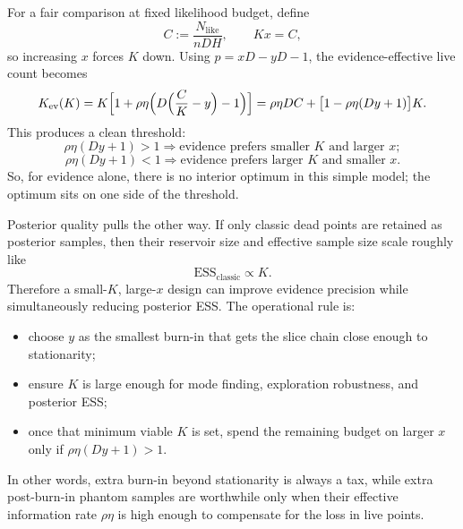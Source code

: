 \documentclass[10pt]{article}
\begin{document}
For a fair comparison at fixed likelihood budget, define
\[
C:=\frac{N_{\mathrm{like}}}{nDH},\qquad Kx=C,
\]
so increasing $x$ forces $K$ down. Using $p=xD-yD-1$, the evidence-effective live count becomes
\[
K_{\mathrm{ev}}(K)=K\Bigl[1+\rho\eta\Bigl(D\Bigl(\frac{C}{K}-y\Bigr)-1\Bigr)\Bigr]
= \rho\eta DC + \bigl[1-\rho\eta(Dy+1)\bigr]K.
\]
This produces a clean threshold:
\[
\boxed{\;\rho\eta(Dy+1)>1 \Longrightarrow \text{evidence prefers smaller $K$ and larger $x$};\;}
\]
\[
\boxed{\;\rho\eta(Dy+1)<1 \Longrightarrow \text{evidence prefers larger $K$ and smaller $x$}.\;}
\]
So, for evidence alone, there is no interior optimum in this simple model; the optimum sits on one side of the threshold.

Posterior quality pulls the other way. If only classic dead points are retained as posterior samples, then their reservoir size and effective sample size scale roughly like
\[
\mathrm{ESS}_{\mathrm{classic}} \propto K.
\]
Therefore a small-$K$, large-$x$ design can improve evidence precision while simultaneously reducing posterior ESS. The operational rule is:
\begin{itemize}
    \item choose $y$ as the smallest burn-in that gets the slice chain close enough to stationarity;
    \item ensure $K$ is large enough for mode finding, exploration robustness, and posterior ESS;
    \item once that minimum viable $K$ is set, spend the remaining budget on larger $x$ only if $\rho\eta(Dy+1)>1$.
\end{itemize}
In other words, extra burn-in beyond stationarity is always a tax, while extra post-burn-in phantom samples are worthwhile only when their effective information rate $\rho\eta$ is high enough to compensate for the loss in live points.
\end{document}
